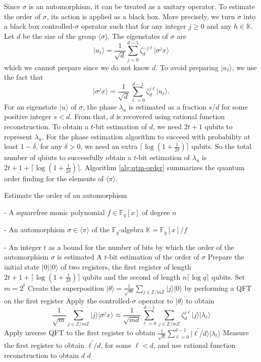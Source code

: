 \documentclass[12pt]{article}
\theoremstyle{plain}
\theoremstyle{definition}
\newcommand{\algbox}[1]{
	\begin{tcolorbox}[width = 0.8\textwidth, colback = white, arc = 2pt, boxrule = 0.5pt] 
		#1 
	\end{tcolorbox}
}
\newcommand{\lrang}[1]{\langle#1\rangle}
\newcommand{\ldbrac}[1]{\lvert#1\rangle}
\def\K{\ensuremath{\mathbb{K}}}
\def\Z{\ensuremath{\mathbb{Z}}}
\def\F{\ensuremath{\mathbb{F}}}
\begin{document}
Since $\sigma$ is an automorphism, it 
can be treated as a unitary operator. To estimate the order of $\sigma$, its action is applied as a
black box. More precisely, we turn $\sigma$ into a black box controlled-$\sigma$ operator such that
for any integer $j \ge 0$ and any $h \in \K$. Let $d$ be the size of the group $\lrang{\sigma}$. 
The eigenstates of $\sigma$ are 
\[ \ldbrac{u_\ell} = \frac{1}{\sqrt{d}} \sum_{j = 0}^{d - 1} \zeta_d^{-j\ell} \ldbrac{\sigma^jx} \]
which we cannot prepare since we do not know $d$. To avoid preparing $\ldbrac{u_\ell}$, we 
use the fact that
\[ \ldbrac{\sigma^jx} = \frac{1}{\sqrt{d}} \sum_{\ell = 0}^{d - 1} \zeta_d^{j\ell} \ldbrac{u_\ell}. 
\]
For an eigenstate $\ldbrac{u}$ of $\sigma$, the phase $\lambda_u$ is estimated as a fraction $s / 
d$ for some positive integer $s < d$. From that, $d$ is recovered using rational function 
reconstruction. To obtain a $t$-bit estimation of $d$, we need $2t + 1$ qubits to represent 
$\lambda_u$. For the phase estimation algorithm to succeed with probability at least $1 - \delta$, 
for any $\delta > 0$, we need an extra $\lceil \log(1 + \frac{1}{2\delta}) \rceil$ qubits. So the 
total number of qbiuts to successfully obtain a $t$-bit estimation of $\lambda_u$ is $2t + 1 + 
\lceil \log(1 + \frac{1}{2\delta}) \rceil$. Algorithm \ref{alg:qtm-order} summarizes the quantum 
order 
finding for the elements of $\lrang{\pi}$.

\begin{algorithm}[t]
	\caption{Estimate the order of an automorphism}
	\label{alg:qtm-order}
	\centering
	\algbox{
	\begin{algorithmic}[1]
		\Require 
		\item[-] A squarefree monic polynomial $f \in \F_q[x]$ of degree $n$
		\item[-] An automorphism $\sigma \in \lrang{\pi}$ of the $\F_q$-algebra $\K = \F_q[x] / f$
		\item[-] An integer $t$ as a bound for the number of bits by which the order of the 
		automorphism $\sigma$ is estimated
		\Ensure A $t$-bit estimation of the order of $\sigma$
		\State Prepare the initial state $\ldbrac{0}\ldbrac{0}$ of two registers, the first 
		register of length $2t + 1 + \lceil \log(1 + \frac{1}{2\delta}) \rceil$ qubits and the 
		second of length $n\lceil \log q \rceil$ qubits.
		\State Set $m = 2^t$
		\State Create the superposition $\ldbrac{\theta} = \frac{1}{\sqrt{m}} \sum_{j \in \Z/m\Z} 
		\ldbrac{j} \ldbrac{0}$ by performing a QFT on the first register
		\State\label{step:cont-sig} 
		Apply the controlled-$\sigma$ operator to $\ldbrac{\theta}$ to obtain
		\[ \frac{1}{\sqrt{m}} \sum_{j \in \Z/m\Z} \ldbrac{j}\ldbrac{\sigma^jx} \approx 
		\frac{1}{\sqrt{md}} \sum_{\ell = 0}^{d - 1} \sum_{j \in \Z/m\Z} \zeta_d^{j\ell} 
		\ldbrac{j} \ldbrac{\lambda_\ell} \]
		\State Apply inverse QFT to the first register to obtain $\frac{1}{\sqrt{d}} \sum_{\ell = 
			0}^{d - 1} \ldbrac{\widetilde{\ell / d}} \ldbrac{\lambda_\ell}$
		\State Measure the first register to obtain $\widetilde{\ell / d}$, for some $\ell < d$, 
		and use rational function reconstruction to obtain $d$
		\State \Return $d$
	\end{algorithmic}}
\end{algorithm}
\end{document}
